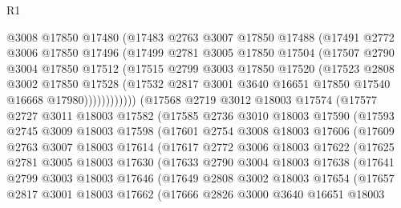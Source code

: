 \begin{lexlean}{R1}
\begin{coremodule}
              @3008
              @17850
              @17480
              (@17483
                @2763
                @3007
                @17850
                @17488
                (@17491
                  @2772
                  @3006
                  @17850
                  @17496
                  (@17499
                    @2781
                    @3005
                    @17850
                    @17504
                    (@17507
                      @2790
                      @3004
                      @17850
                      @17512
                      (@17515
                        @2799
                        @3003
                        @17850
                        @17520
                        (@17523
                          @2808
                          @3002
                          @17850
                          @17528
                          (@17532 @2817 @3001 @3640 @16651 @17850 @17540 @16668 @17980))))))))))))
    (@17568
      @2719
      @3012
      @18003
      @17574
      (@17577
        @2727
        @3011
        @18003
        @17582
        (@17585
          @2736
          @3010
          @18003
          @17590
          (@17593
            @2745
            @3009
            @18003
            @17598
            (@17601
              @2754
              @3008
              @18003
              @17606
              (@17609
                @2763
                @3007
                @18003
                @17614
                (@17617
                  @2772
                  @3006
                  @18003
                  @17622
                  (@17625
                    @2781
                    @3005
                    @18003
                    @17630
                    (@17633
                      @2790
                      @3004
                      @18003
                      @17638
                      (@17641
                        @2799
                        @3003
                        @18003
                        @17646
                        (@17649
                          @2808
                          @3002
                          @18003
                          @17654
                          (@17657
                            @2817
                            @3001
                            @18003
                            @17662
                            (@17666
                              @2826
                              @3000
                              @3640
                              @16651
                              @18003

\end{coremodule}
\end{lexlean}
